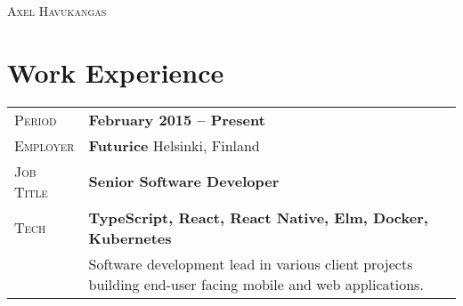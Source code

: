 \documentclass[a4paper, oneside, final]{scrartcl} %
\newcommand{\gray}{\rowcolor[gray]{.90}} %
\begin{document}
\begin{center} %


{\fontsize{36}{36}\selectfont\scshape Axel Havukangas} %

\vspace{0.2cm} %





\section{Work Experience}

\begin{tabularx}{0.97\linewidth}{>{\raggedleft\scshape}p{2cm}X}
\gray Period & \textbf{February 2015 -- Present}\\
\gray Employer & \textbf{Futurice} \hfill Helsinki, Finland\\
\gray Job Title & \textbf{Senior Software Developer}\\
\gray Tech & \textbf{TypeScript, React, React Native, Elm, Docker, Kubernetes}\\
       & Software development lead in various client projects building end-user facing mobile and web applications.
\end{tabularx}

\vspace{12pt}


\end{center}
\end{document}
